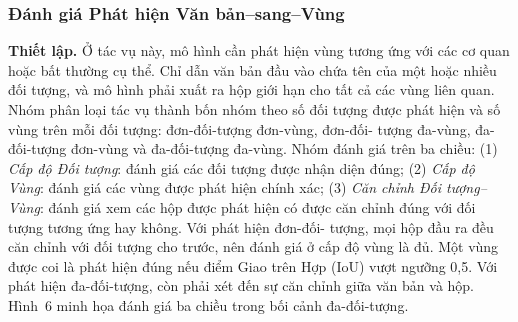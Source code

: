 \documentclass[12pt,a4paper,oneside]{extarticle}
\begin{document}
\subsubsection{Đánh giá Phát hiện Văn bản--sang--Vùng}

\noindent\textbf{Thiết lập.} Ở tác vụ này, mô hình cần phát hiện vùng tương ứng với các cơ quan
hoặc bất thường cụ thể. Chỉ dẫn văn bản đầu vào chứa tên của một hoặc nhiều đối tượng, và mô hình
phải xuất ra hộp giới hạn cho tất cả các vùng liên quan. Nhóm phân loại tác vụ thành bốn nhóm
theo số đối tượng được phát hiện và số vùng trên mỗi đối tượng: đơn-đối-tượng đơn-vùng, đơn-đối-
tượng đa-vùng, đa-đối-tượng đơn-vùng và đa-đối-tượng đa-vùng. Nhóm đánh giá trên ba chiều: (1)
\emph{Cấp độ Đối tượng}: đánh giá các đối tượng được nhận diện đúng; (2) \emph{Cấp độ Vùng}: đánh
giá các vùng được phát hiện chính xác; (3) \emph{Căn chỉnh Đối tượng--Vùng}: đánh giá xem các hộp
được phát hiện có được căn chỉnh đúng với đối tượng tương ứng hay không. Với phát hiện đơn-đối-
tượng, mọi hộp đầu ra đều căn chỉnh với đối tượng cho trước, nên đánh giá ở cấp độ vùng là đủ.
Một vùng được coi là phát hiện đúng nếu điểm Giao trên Hợp (IoU) vượt ngưỡng 0,5. Với phát hiện
đa-đối-tượng, còn phải xét đến sự căn chỉnh giữa văn bản và hộp. Hình~6 minh họa đánh giá ba
chiều trong bối cảnh đa-đối-tượng.
\end{document}

